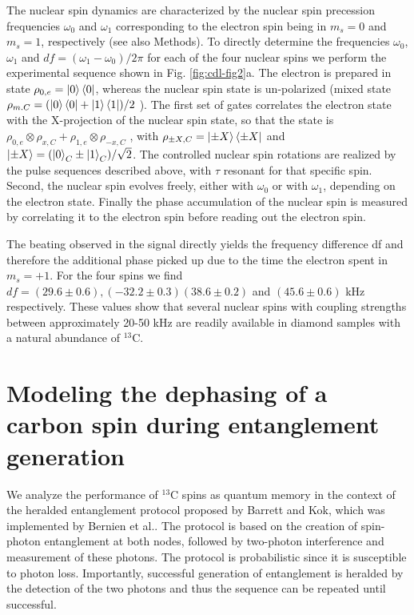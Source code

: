 The nuclear spin dynamics are characterized by the nuclear spin precession frequencies $\omega_0$ and $\omega_1$  corresponding to the electron spin being in $m_s = 0$ and $m_s = 1$, respectively (see also Methods). To directly determine the frequencies $\omega_0$,  $\omega_1$ and $df = ( \omega_1 − \omega_0 )/2 \pi$  for each of the four nuclear spins we perform the experimental sequence\cite{Laraoui_NatCommun_2013} shown in Fig. \ref{fig:cdl-fig2}a. The electron is prepared in state $\rho_{0,e} = \left|0\right>\left<0\right|$, whereas the nuclear spin state is un-polarized (mixed state $\rho_{m.C} = (\left|0\right>\left<0\right| + \left|1\right>\left<1\right|)/2$ ). The first set of gates correlates the electron state with the X-projection of the nuclear spin state, so that the state is $\rho_{0,e} \otimes \rho_{x,C} + \rho_{1,e} \otimes \rho_{-x,C}$ , with $\rho_{\pm X,C} = \left|\pm X\right>\left<\pm X\right|$ and  $\left|\pm X\right> = (\left|0\right>_C \pm \left|1\right>_C)/\sqrt{2}$. The controlled nuclear spin rotations are realized by the pulse sequences described above, with $\tau$ resonant for that specific spin. Second, the nuclear spin evolves freely, either with $\omega_0$ or with $\omega_1$, depending on the electron state. Finally the phase accumulation of the nuclear spin is measured by correlating it to the electron spin before reading out the electron spin. 

The beating observed in the signal directly yields the frequency difference df and therefore the additional phase picked up due to the time the electron spent in $m_s = + 1$.   For the four spins we find $df = (29.6 \pm 0.6), (-32.2 \pm 0.3) (38.6 \pm 0.2)$ and $ (45.6 \pm 0.6) $  kHz respectively.  These values show that several nuclear spins with coupling strengths between approximately 20-50 kHz are readily available in diamond samples with a natural abundance of $^{13}$C.

\section{Modeling the dephasing of a carbon spin during entanglement generation}

We analyze the performance of $^{13}$C spins as quantum memory in the context of  the  heralded entanglement protocol proposed by Barrett and Kok\cite{Barrett_Phys.Rev.A_2005}, which was implemented by Bernien et al.\cite{Bernien_Nature_2013}. The protocol is based on the creation of spin-photon entanglement at both nodes, followed by two-photon interference and measurement of these photons. The protocol is probabilistic since it is susceptible to photon loss. Importantly, successful generation of entanglement is heralded by the detection of the two photons and thus the sequence can be repeated until successful. 

